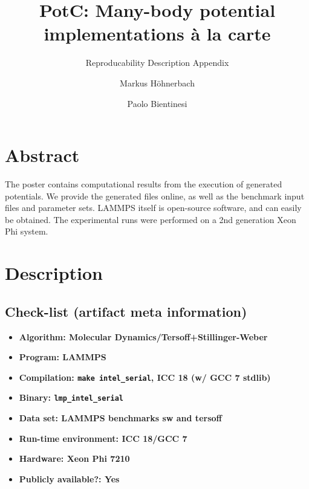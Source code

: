 \documentclass[sigconf]{acmart}
\begin{document}
\title{PotC: Many-body potential implementations \`a la carte}
\subtitle{Reproducability Description Appendix}

\author{Markus H\"ohnerbach}

\author{Paolo Bientinesi}

\renewcommand{\shortauthors}{M. H\"ohnerbach et al.}

\maketitle

\section{Abstract}

The poster contains computational results from the execution of generated potentials.
We provide the generated files online, as well as the benchmark input files and parameter sets.
LAMMPS itself is open-source software, and can easily be obtained.
The experimental runs were performed on a 2nd generation Xeon Phi system.

\section{Description}

\subsection{Check-list (artifact meta information)}

{\small
\begin{itemize}
  \item {\bf Algorithm: Molecular Dynamics/Tersoff+Stillinger-Weber}
  \item {\bf Program: LAMMPS}
  \item {\bf Compilation: \verb+make intel_serial+, ICC 18 (w/ GCC 7 stdlib)}
  \item {\bf Binary: \verb+lmp_intel_serial+}
  \item {\bf Data set: LAMMPS benchmarks sw and tersoff}
  \item {\bf Run-time environment: ICC 18/GCC 7}
  \item {\bf Hardware: Xeon Phi 7210}
  \item {\bf Publicly available?: Yes}
\end{itemize}
}
\end{document}
